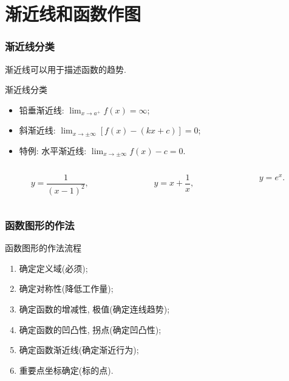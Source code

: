 \documentclass[
10pt,
aspectratio=43,
]{beamer}
\begin{document}
\section{渐近线和函数作图}
\begin{frame}
	\frametitle{渐近线分类}
	渐近线可以用于描述函数的趋势.
	\vspace{0.3cm}
	\begin{block}{渐近线分类}
		\begin{itemize}
			\item 铅垂渐近线: $\lim_{x\to a^+} f(x) = \infty$;
			\item 斜渐近线: $\lim_{x\to \pm\infty}\left[f(x)-(kx+c)\right]=0$;
			\item 特例: 水平渐近线: $\lim_{x\to \pm\infty}f(x)-c=0$.
		\end{itemize}
	\end{block}
	\vspace{1.2cm}
	\begin{columns}[T]
		\begin{column}{0.33\textwidth}
			\begin{equation*}
				y = \frac{1}{(x-1)^2},
			\end{equation*}
		\end{column}
		\begin{column}{0.33\textwidth}
			\begin{equation*}
				y = x+\frac{1}{x},
			\end{equation*}
		\end{column}
		\begin{column}{0.33\textwidth}
			\begin{equation*}
				y = e^{x}.
			\end{equation*}
		\end{column}
	\end{columns}
\end{frame}

\begin{frame}
	\frametitle{函数图形的作法}
\begin{block}{函数图形的作法流程}
	\begin{enumerate}
		\item 确定定义域(必须);
		\pause
		\item 确定对称性(降低工作量);
		\pause
		\item 确定函数的增减性, 极值(确定连线趋势);
		\pause
		\item 确定函数的凹凸性, 拐点(确定凹凸性);
		\pause
		\item 确定函数渐近线(确定渐近行为);
		\pause
		\item 重要点坐标确定(标的点).
	\end{enumerate}
\end{block}
\end{frame}
\end{document}
